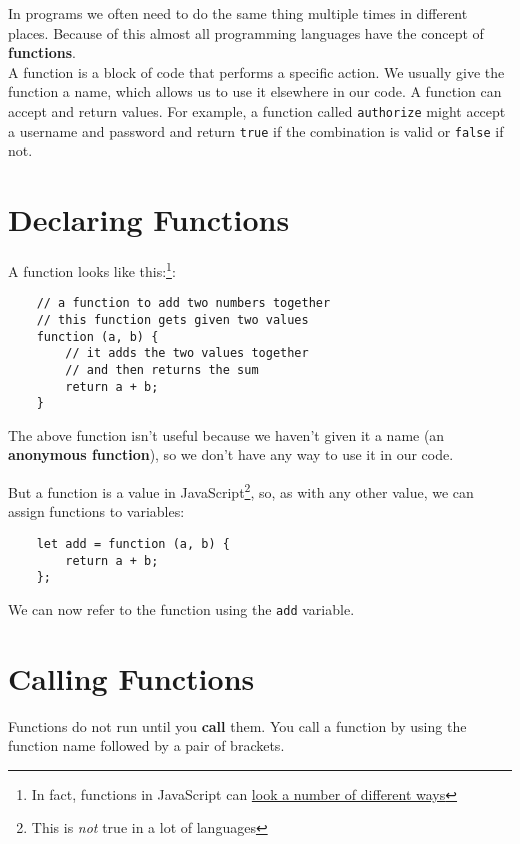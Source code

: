 In programs we often need to do the same thing multiple times in different places. Because of this almost all programming languages have the concept of \textbf{functions}.
\\

A function is a block of code that performs a specific action. We usually give the function a name, which allows us to use it elsewhere in our code. A function can accept and return values. For example, a function called \texttt{authorize} might accept a username and password and return \texttt{true} if the combination is valid or \texttt{false} if not.


\section{Declaring Functions}

A function looks like this:\footnote{In fact, functions in JavaScript can \href{https://dmitripavlutin.com/6-ways-to-declare-javascript-functions/}{look a number of different ways}}:

\begin{verbatim}
    // a function to add two numbers together
    // this function gets given two values
    function (a, b) {
        // it adds the two values together
        // and then returns the sum
        return a + b;
    }
\end{verbatim}

The above function isn't useful because we haven't given it a name (an \textbf{anonymous function}), so we don't have any way to use it in our code.

\pagebreak

But a function is a value in JavaScript\footnote{This is \textit{not} true in a lot of languages}, so, as with any other value, we can assign functions to variables:

\begin{verbatim}
    let add = function (a, b) {
        return a + b;
    };
\end{verbatim}

We can now refer to the function using the \texttt{add} variable.


\section{Calling Functions}

Functions do not run until you \textbf{call} them. You call a function by using the function name followed by a pair of brackets.
\\

